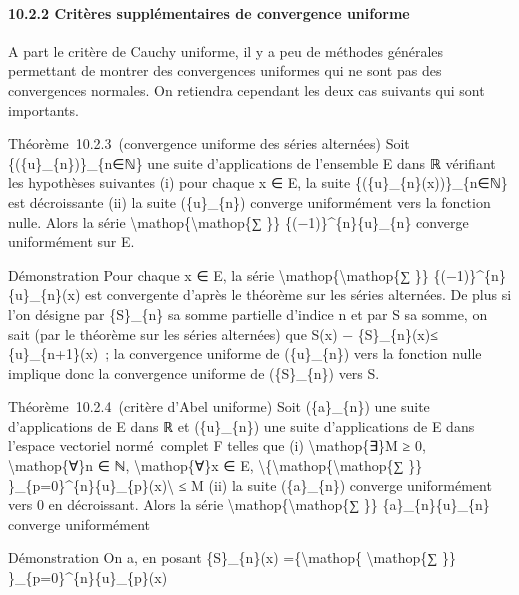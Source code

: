 \documentclass[]{article}
\begin{document}
\paragraph{10.2.2 Critères supplémentaires de convergence uniforme}

A part le critère de Cauchy uniforme, il y a peu de méthodes générales
permettant de montrer des convergences uniformes qui ne sont pas des
convergences normales. On retiendra cependant les deux cas suivants qui
sont importants.

Théorème~10.2.3~(convergence uniforme des séries alternées) Soit
\{(\{u\}\_\{n\})\}\_\{n∈ℕ\} une suite d'applications de l'ensemble E
dans ℝ vérifiant les hypothèses suivantes (i) pour chaque x ∈ E, la
suite \{(\{u\}\_\{n\}(x))\}\_\{n∈ℕ\} est décroissante (ii) la suite
(\{u\}\_\{n\}) converge uniformément vers la fonction nulle. Alors la
série \textbackslash{}mathop\{\textbackslash{}mathop\{∑ \}\}
\{(−1)\}\^{}\{n\}\{u\}\_\{n\} converge uniformément sur E.

Démonstration Pour chaque x ∈ E, la série
\textbackslash{}mathop\{\textbackslash{}mathop\{∑ \}\}
\{(−1)\}\^{}\{n\}\{u\}\_\{n\}(x) est convergente d'après le théorème sur
les séries alternées. De plus si l'on désigne par \{S\}\_\{n\} sa somme
partielle d'indice n et par S sa somme, on sait (par le théorème sur les
séries alternées) que \textbar{}S(x) − \{S\}\_\{n\}(x)\textbar{}≤
\{u\}\_\{n+1\}(x)~; la convergence uniforme de (\{u\}\_\{n\}) vers la
fonction nulle implique donc la convergence uniforme de (\{S\}\_\{n\})
vers S.

Théorème~10.2.4~(critère d'Abel uniforme) Soit (\{a\}\_\{n\}) une suite
d'applications de E dans ℝ et (\{u\}\_\{n\}) une suite d'applications de
E dans l'espace vectoriel normé~complet F telles que (i)
\textbackslash{}mathop\{∃\}M ≥ 0, \textbackslash{}mathop\{∀\}n ∈ ℕ,
\textbackslash{}mathop\{∀\}x ∈ E,
\textbackslash{}\textbar{}\{\textbackslash{}mathop\{\textbackslash{}mathop\{∑
\}\} \}\_\{p=0\}\^{}\{n\}\{u\}\_\{p\}(x)\textbackslash{}\textbar{} ≤ M
(ii) la suite (\{a\}\_\{n\}) converge uniformément vers 0 en
décroissant. Alors la série
\textbackslash{}mathop\{\textbackslash{}mathop\{∑ \}\}
\{a\}\_\{n\}\{u\}\_\{n\} converge uniformément

Démonstration On a, en posant \{S\}\_\{n\}(x)
=\{\textbackslash{}mathop\{ \textbackslash{}mathop\{∑ \}\}
\}\_\{p=0\}\^{}\{n\}\{u\}\_\{p\}(x)
\end{document}
